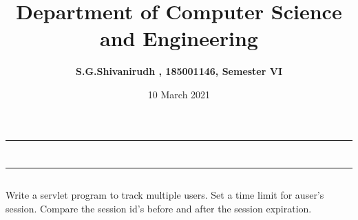\documentclass[12pt,letterpaper]{article}
\title{\textbf{Department of Computer Science and Engineering}}
\author{\textbf{S.G.Shivanirudh , 185001146, Semester VI }}
\date{10 March 2021}
\begin{document}
\maketitle
\hrule
\section*{}
\hrule 
\bigskip\bigskip

\subsection*{}

\subsection*{}
\begin{flushleft}
    Write a servlet program to track multiple users. 
    Set a time limit for auser’s session. Compare the session id’s before and after the session expiration.
\end{flushleft}

\subsection*{}
\subsubsection*{}
\begin{flushleft}

\end{flushleft}

\subsubsection*{}
\begin{flushleft}

\end{flushleft}

\subsubsection*{}
\begin{flushleft}

\end{flushleft}
\end{document}
